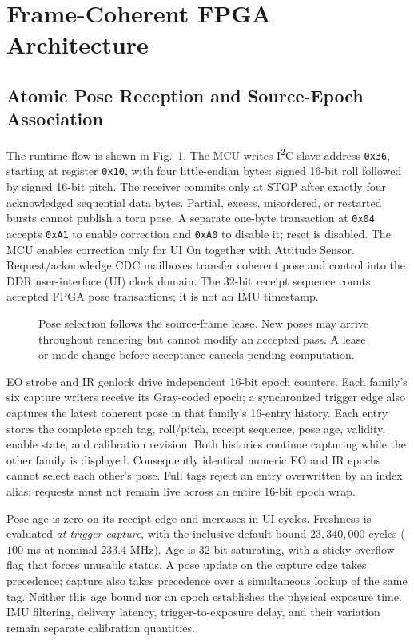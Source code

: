 \section{Frame-Coherent FPGA Architecture}
\label{sec:gl_architecture}
\label{sec:fpga}

\subsection{Atomic Pose Reception and Source-Epoch Association}
The runtime flow is shown in Fig.~\ref{fig:gl_runtime}.
The MCU writes I\textsuperscript{2}C slave address \texttt{0x36}, starting
at register \texttt{0x10}, with four little-endian bytes: signed 16-bit
roll followed by signed 16-bit pitch. The receiver commits only at STOP
after exactly four acknowledged sequential data bytes. Partial, excess,
misordered, or restarted bursts cannot publish a torn pose. A separate
one-byte transaction at \texttt{0x04} accepts \texttt{0xA1} to enable
correction and \texttt{0xA0} to disable it; reset is disabled. The MCU
enables correction only for UI On together with Attitude Sensor.
Request/acknowledge CDC mailboxes transfer coherent pose and control into
the DDR user-interface (UI) clock domain. The 32-bit receipt sequence counts
accepted FPGA pose transactions; it is not an IMU timestamp.

\begin{figure}[t]
\centering
\caption{Pose selection follows the source-frame lease. New poses may arrive
throughout rendering but cannot modify an accepted pass. A lease or mode
change before acceptance cancels pending computation.}
\label{fig:gl_runtime}
\end{figure}

EO strobe and IR genlock drive independent 16-bit epoch counters. Each
family's six capture writers receive its Gray-coded epoch; a synchronized
trigger edge also captures the latest coherent pose in that family's
16-entry history. Each entry stores the complete epoch tag, roll/pitch,
receipt sequence, pose age, validity, enable state, and calibration revision.
Both histories continue capturing while the other family is displayed.
Consequently identical numeric EO and IR epochs cannot select each other's
pose. Full tags reject an entry overwritten by an index alias; requests
must not remain live across an entire 16-bit epoch wrap.

Pose age is zero on its receipt edge and increases in UI cycles. Freshness
is evaluated \emph{at trigger capture}, with the inclusive default bound
$23{,}340{,}000$ cycles ($100$ ms at nominal $233.4$ MHz).
Age is 32-bit saturating, with a sticky overflow flag that forces unusable
status. A pose update on the capture edge takes precedence; capture also
takes precedence over a simultaneous lookup of the same tag. Neither this
age bound nor an epoch establishes the physical exposure time. IMU filtering,
delivery latency, trigger-to-exposure delay, and their variation remain
separate calibration quantities.


